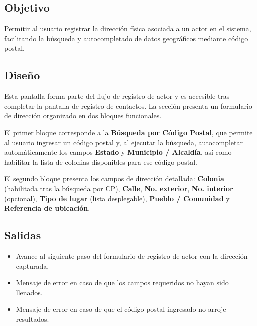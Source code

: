 \subsection{Objetivo}
Permitir al usuario registrar la dirección física asociada a un actor en el 
sistema, facilitando la búsqueda y autocompletado de datos geográficos mediante 
código postal.

\subsection{Diseño}
Esta pantalla  forma 
parte del flujo de registro de actor y es accesible tras completar la pantalla 
de registro de contactos. La sección presenta un formulario de dirección 
organizado en dos bloques funcionales.

El primer bloque corresponde a la \textbf{Búsqueda por Código Postal}, que 
permite al usuario ingresar un código postal y, al ejecutar la búsqueda, 
autocompletar automáticamente los campos \textbf{Estado} y \textbf{Municipio / 
	Alcaldía}, así como habilitar la lista de colonias disponibles para ese código 
postal.

El segundo bloque presenta los campos de dirección detallada: \textbf{Colonia} 
(habilitada tras la búsqueda por CP), \textbf{Calle}, \textbf{No. exterior}, 
\textbf{No. interior} (opcional), \textbf{Tipo de lugar} (lista desplegable), 
\textbf{Pueblo / Comunidad} y \textbf{Referencia de ubicación}.


\subsection{Salidas}
\begin{itemize}
	\item Avance al siguiente paso del formulario de registro de actor con la 
	dirección capturada.
	\item Mensaje de error  en 
	caso de que los campos requeridos no hayan sido llenados.
	\item Mensaje de error  en caso 
	de que el código postal ingresado no arroje resultados.
\end{itemize}

